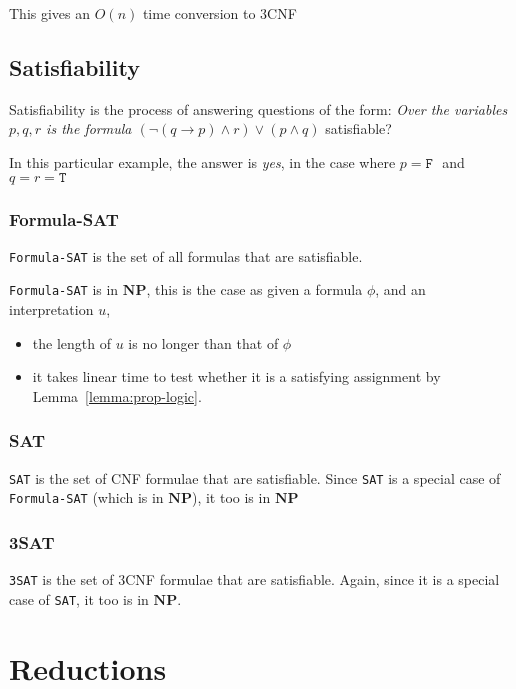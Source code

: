 \documentclass{article}
\newcommand{\T}{\texttt{T }}
\newcommand{\F}{\texttt{F }}
\newcommand{\NP}{\mathbf{NP}}
\begin{document}
This gives an $O(n)$ time conversion to 3CNF


\subsection{Satisfiability}
\label{subsec:satisfiability}


Satisfiability is the process of answering questions of the form: \textit{Over the variables $p,q,r$ is the formula $(\neg(q \rightarrow p) \wedge r) \vee (p \wedge q)$}  satisfiable?

In this particular example, the answer is \textit{yes}, in the case where $p= \F$ and $q = r = \T$

\subsubsection{Formula-SAT}
\label{subsubsec:fsat}

\texttt{Formula-SAT} is the set of all formulas that are satisfiable.

\texttt{Formula-SAT} is in $\NP$, this is the case as given a formula $\phi$, and an interpretation $u$,
\begin{itemize}
  \item the length of $u$ is no longer than that of $\phi$
  \item it takes linear time to test whether it is a satisfying assignment by Lemma~\ref{lemma:prop-logic}.
\end{itemize}

\subsubsection{SAT}
\label{subsubsec:sat}

\texttt{SAT} is the set of CNF formulae that are satisfiable. Since \texttt{SAT} is a special case of \texttt{Formula-SAT} (which is in $\NP$), it too is in $\NP$

\subsubsection{3SAT}
\label{subsubsec:3sat}

\texttt{3SAT} is the set of 3CNF formulae that are satisfiable. Again, since it is a special case of \texttt{SAT}, it too is in $\NP$.

\section{Reductions}
\label{sec:reductions}
\end{document}
